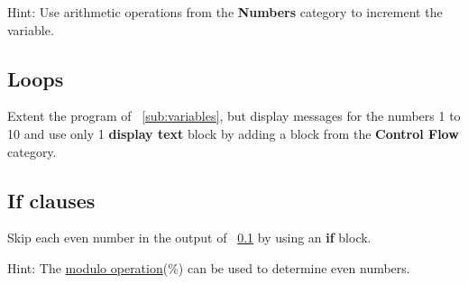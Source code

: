 \documentclass[12pt,twoside,a4paper]{article}
\begin{document}
Hint: Use arithmetic operations from the \textbf{Numbers} category to increment the variable.

\subsection{Loops}\label{sub:loops}
Extent the program of ~\ref{sub:variables}, but display messages for the numbers 1 to 10 and use only 1 \textbf{display text} block by adding a block from the \textbf{Control Flow} category.

\subsection{If clauses}
Skip each even number in the output of ~\ref{sub:loops} by using an \textbf{if} block.

Hint: The \href{https://en.wikipedia.org/wiki/Modulo_operation}{modulo operation}(\%) can be used to determine even numbers.
\end{document}
